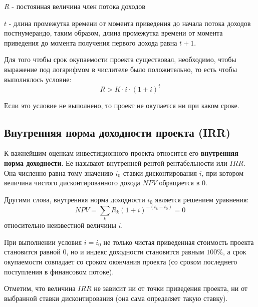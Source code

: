 \documentclass[aps,%
12pt,%
final,%
oneside,
onecolumn,%
musixtex, %
superscriptaddress,%
centertags]{article} %
\theoremstyle{plain}
\theoremstyle{definition}
\theoremstyle{remark}
\begin{document}
$R$ - постоянная величина член потока доходов

$t$ - длина промежутка времени от момента приведения до начала потока доходов постнумерандо, таким образом, длина промежутка времени от момента приведения до момента получения первого дохода равна $t+1$.

Для того чтобы срок окупаемости проекта существовал, необходимо, чтобы выражение под логарифмом в числителе было положительно, то есть чтобы выполнялось условие:
$$R > K \cdot i \cdot (1+i)^t$$

Если это условие не выполнено, то проект не окупается ни при каком сроке.


\subsection{Внутренняя норма доходности проекта (IRR)}

К важнейшим оценкам инвестиционного проекта относится его \textbf{внутренняя норма доходности}. Ее называют внутренней рентой рентабельности или $IRR$. Она численно равна тому значению $i_0$ ставки дисконтирования $i$, при котором величина чистого дисконтированного дохода $NPV$ обращается в $0$.

Другими слова, внутренняя норма доходности $i_0$ является решением уравнения:
$$NPV = \sum\limits_k R_k (1+i)^{-(t_k-t_0)} = 0$$
относительно неизвестной величины $i$.

При выполнении условия $i=i_0$ не только чистая приведенная стоимость проекта становится равной $0$, но и индекс доходности становится равным $100\%$, а срок окупаемости совпадает со сроком окончания проекта (со сроком последнего поступления в финансовом потоке).

Отметим, что величина $IRR$ не зависит ни от точки приведения проекта, ни от выбранной ставки дисконтирования (она сама определяет такую ставку).

\end{document}
